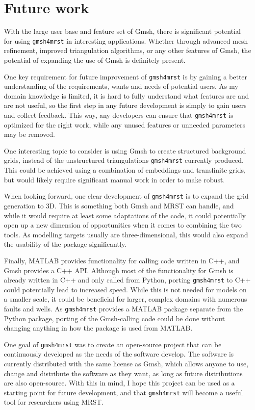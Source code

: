 \section{Future work}
\label{sec:Future}
With the large user base and feature set of Gmsh, there is significant potential for using \verb|gmsh4mrst| in interesting applications. Whether through advanced mesh refinement, improved triangulation algorithms, or any other features of Gmsh, the potential of expanding the use of Gmsh is definitely present.

One key requirement for future improvement of \verb|gmsh4mrst| is by gaining a better understanding of the requirements, wants and needs of potential users. As my domain knowledge is limited, it is hard to fully understand what features are and are not useful, so the first step in any future development is simply to gain users and collect feedback. This way, any developers can ensure that \verb|gmsh4mrst| is optimized for the right work, while any unused features or unneeded parameters may be removed.

One interesting topic to consider is using Gmsh to create structured background grids, instead of the unstructured triangulations \verb|gmsh4mrst| currently produced. This could be achieved using a combination of embeddings and transfinite grids, but would likely require significant manual work in order to make robust.

When looking forward, one clear development of \verb|gmsh4mrst| is to expand the grid generation to 3D. This is something both Gmsh and MRST can handle, and while it would require at least some adaptations of the code, it could potentially open up a new dimension of opportunities when it comes to combining the two tools. As modelling targets usually are three-dimensional, this would also expand the usability of the package significantly.

Finally, MATLAB provides functionality for calling code written in C++, and Gmsh provides a C++ API. Although most of the functionality for Gmsh is already written in C++ and only called from Python, porting \verb|gmsh4mrst| to C++ could potentially lead to increased speed. While this is not needed for models on a smaller scale, it could be beneficial for larger, complex domains with numerous faults and wells. As \verb|gmsh4mrst| provides a MATLAB package separate from the Python package, porting of the Gmsh-calling code could be done without changing anything in how the package is used from MATLAB.

One goal of \verb|gmsh4mrst| was to create an open-source project that can be continuously developed as the needs of the software develop. The software is currently distributed with the same license as Gmsh, which allows anyone to use, change and distribute the software as they want, as long as future distributions are also open-source. With this in mind, I hope this project can be used as a starting point for future development, and that \verb|gmsh4mrst| will become a useful tool for researchers using MRST.
